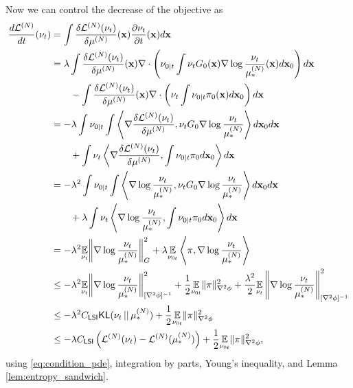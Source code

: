 \documentclass{article}
\newcommand{\CLSI}[0]{C_{\mathsf{LSI}}}
\newcommand{\sep}[0]{\,||\,}
\newcommand{\KL}[0]{\mathsf{KL}}
\begin{document}
Now we can control the decrease of the objective as
\begin{align}
    \frac{d\mathcal{L}^{(N)}}{dt}(\nu_t) &= \int \frac{\delta\mathcal{L}^{(N)}(\nu_t)}{\delta\mu^{(N)}}(\mathbf{x})\frac{\partial\nu_t}{\partial t}(\mathbf{x})d\mathbf{x}\notag\\
    &= \lambda \int \frac{\delta\mathcal{L}^{(N)}(\nu_t)}{\delta\mu^{(N)}}(\mathbf{x})\nabla \cdot \left(\nu_{0|t}\int\nu_t G_0(\mathbf{x})\nabla \log\frac{\nu_t}{\mu_*^{(N)}}(\mathbf{x})d\mathbf{x}_0\right)d\mathbf{x}\notag\\
    &\qquad - \int \frac{\delta\mathcal{L}^{(N)}(\nu_t)}{\delta\mu^{(N)}}(\mathbf{x})\nabla \cdot 
    \left(\nu_t\int\nu_{0|t}\pi_0(\mathbf{x})d\mathbf{x}_0\right)d\mathbf{x}\notag\\
    &= -\lambda \int \nu_{0|t}\int\left\langle\nabla\frac{\delta\mathcal{L}^{(N)}(\nu_t)}{\delta\mu^{(N)}},\nu_t G_0\nabla \log\frac{\nu_t}{\mu_*^{(N)}}\right\rangle d\mathbf{x}_0d\mathbf{x}\notag\\
    &\qquad + \int \nu_t\left\langle\nabla\frac{\delta\mathcal{L}^{(N)}(\nu_t)}{\delta\mu^{(N)}}, \int\nu_{0|t}\pi_0d\mathbf{x}_0\right\rangle d\mathbf{x}\notag\\
    &= -\lambda^2 \int \nu_{0|t}\int\left\langle\nabla \log\frac{\nu_t}{\mu_*^{(N)}},\nu_t G_0\nabla \log\frac{\nu_t}{\mu_*^{(N)}}\right\rangle d\mathbf{x}_0d\mathbf{x}\notag\\
    &\qquad + \lambda\int \nu_t\left\langle\nabla \log\frac{\nu_t}{\mu_*^{(N)}}, \int\nu_{0|t}\pi_0d\mathbf{x}_0\right\rangle d\mathbf{x}\notag\\
    &= -\lambda^2\underset{\nu_{t}}{\mathbb{E}}\bigg\|\nabla \log\frac{\nu_t}{\mu_*^{(N)}}\bigg\|_G^2+ \lambda\underset{\nu_{0t}}{\mathbb{E}}\left\langle \pi, \nabla \log\frac{\nu_t}{\mu_*^{(N)}}\right\rangle\label{eq:for_refined_analysis}\\
&\le -\lambda^2\underset{\nu_{t}}{\mathbb{E}}\bigg\|\nabla \log\frac{\nu_t}{\mu_*^{(N)}}\bigg\|_{[\nabla^2\phi]^{-1}}^2+ \frac{1}{2}\underset{\nu_{0t}}{\mathbb{E}}\|\pi\|_{\nabla^2\phi}^2 + \frac{\lambda^2}{2}\underset{\nu_t}{\mathbb{E}}\left\|\nabla \log\frac{\nu_t}{\mu_*^{(N)}}\right\|^2_{[\nabla^2\phi]^{-1}} \notag\\
     &\le -\lambda^2\CLSI{\KL(\nu_t\sep\mu_*^{(N)})} +  \frac{1}{2}\underset{\nu_{0t}}{\mathbb{E}}\|\pi\|^2_{\nabla^2\phi}\notag\\
     &\le -\lambda\CLSI\left(\mathcal{L}^{(N)}(\nu_t) - \mathcal{L}^{(N)}(\mu_*^{(N)})\right) + \frac{1}{2}\underset{\nu_{0t}}{\mathbb{E}}\|\pi\|^2_{\nabla^2\phi},\label{eq:dL_dt}
\end{align}
using \eqref{eq:condition_pde}, integration by parts, Young's inequality, and Lemma \ref{lem:entropy_sandwich}.
\end{document}
